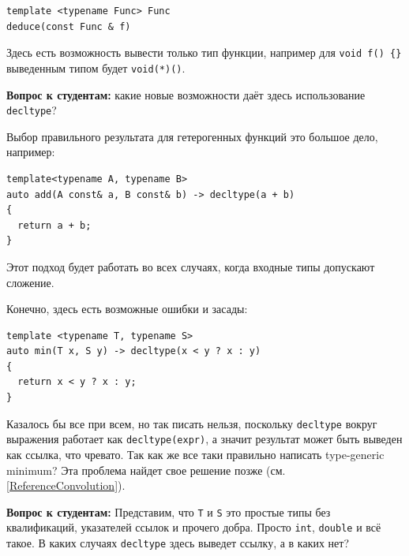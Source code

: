 \documentclass[a4paper,12pt,oneside]{article}
\newif\ifanswers
\begin{document}
\begin{lstlisting}
template <typename Func> Func 
deduce(const Func & f)
\end{lstlisting}

Здесь есть возможность вывести только тип функции, например для \lstinline!void f() {}! выведенным типом будет \lstinline!void(*)()!.

\textbf{Вопрос к студентам:} какие новые возможности даёт здесь использование \lstinline!decltype!?

\ifanswers
Новый стандарт даёт вывести тип возвращаемого значения функции:

\begin{lstlisting}
template <typename Func>
auto deduce(const Func & f) -> decltype(f())
\end{lstlisting}

В данном случае это будет \lstinline!void!
\fi 

Выбор правильного результата для гетерогенных функций это большое дело, например:

\begin{lstlisting}
template<typename A, typename B> 
auto add(A const& a, B const& b) -> decltype(a + b) 
{ 
  return a + b; 
}
\end{lstlisting}

Этот подход будет работать во всех случаях, когда входные типы допускают сложение.

Конечно, здесь есть возможные ошибки и засады:

\begin{lstlisting}
template <typename T, typename S>
auto min(T x, S y) -> decltype(x < y ? x : y) 
{
  return x < y ? x : y;
}
\end{lstlisting}

Казалось бы все при всем, но так писать нельзя, поскольку \lstinline!decltype! вокруг выражения работает как \lstinline!decltype(expr)!, а значит результат может быть выведен как ссылка, что чревато. Так как же все таки правильно написать type-generic minimum? Эта проблема найдет свое решение позже (см. \ref{ReferenceConvolution}).

\textbf{Вопрос к студентам:} Представим, что \lstinline!T! и \lstinline!S! это простые типы без квалификаций, указателей ссылок и прочего добра. Просто  \lstinline!int!, \lstinline!double! и всё такое. В каких случаях  \lstinline!decltype! здесь выведет ссылку, а в каких нет? 

\ifanswers
Правильный ответ: ссылка будет если типы одинаковые. Если они разные, все будет хорошо.
\fi
\end{document}
